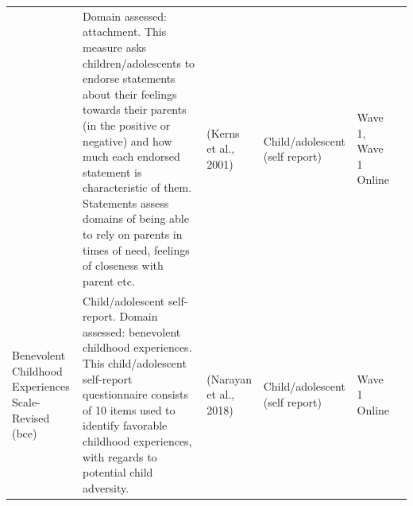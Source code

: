 \documentclass[]{book}
\begin{document}
\begin{longtable}[]{@{}llllll@{}}
\begin{minipage}[t]{0.18\columnwidth}
\end{minipage} & \begin{minipage}[t]{0.18\columnwidth}\raggedright
Domain assessed: attachment. This measure asks children/adolescents to endorse statements about their feelings towards their parents (in the positive or negative) and how much each endorsed statement is characteristic of them. Statements assess domains of being able to rely on parents in times of need, feelings of closeness with parent etc.\strut
\end{minipage} & \begin{minipage}[t]{0.15\columnwidth}\raggedright
(Kerns et al., 2001)\strut
\end{minipage} & \begin{minipage}[t]{0.16\columnwidth}\raggedright
Child/adolescent (self report)\strut
\end{minipage} & \begin{minipage}[t]{0.06\columnwidth}\raggedright
Wave 1, Wave 1 Online\strut
\end{minipage} & \begin{minipage}[t]{0.10\columnwidth}\raggedright
\strut
\end{minipage}\tabularnewline
\begin{minipage}[t]{0.18\columnwidth}\raggedright
Benevolent Childhood Experiences Scale- Revised (bce)\strut
\end{minipage} & \begin{minipage}[t]{0.18\columnwidth}\raggedright
Child/adolescent self-report. Domain assessed: benevolent childhood experiences. This child/adolescent self-report questionnaire consists of 10 items used to identify favorable childhood experiences, with regards to potential child adversity.\strut
\end{minipage} & \begin{minipage}[t]{0.15\columnwidth}\raggedright
(Narayan et al., 2018)\strut
\end{minipage} & \begin{minipage}[t]{0.16\columnwidth}\raggedright
Child/adolescent (self report)\strut
\end{minipage} & \begin{minipage}[t]{0.06\columnwidth}\raggedright
Wave 1 Online\strut
\end{minipage} & \begin{minipage}[t]{0.10\columnwidth}\raggedright
\strut
\end{minipage}\tabularnewline
\bottomrule
\end{longtable}
\end{document}
